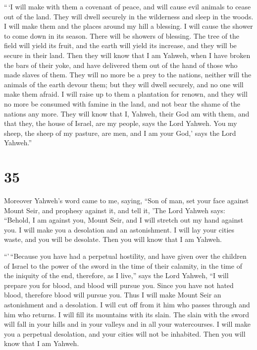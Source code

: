  ``\,`I will make with them a covenant of peace, and will
cause evil animals to cease out of the land. They will dwell securely in
the wilderness and sleep in the woods.  I will make them
and the places around my hill a blessing. I will cause the shower to
come down in its season. There will be showers of blessing.
 The tree of the field will yield its fruit, and the
earth will yield its increase, and they will be secure in their land.
Then they will know that I am Yahweh, when I have broken the bars of
their yoke, and have delivered them out of the hand of those who made
slaves of them.  They will no more be a prey to the
nations, neither will the animals of the earth devour them; but they
will dwell securely, and no one will make them afraid.  I
will raise up to them a plantation for renown, and they will no more be
consumed with famine in the land, and not bear the shame of the nations
any more.  They will know that I, Yahweh, their God am
with them, and that they, the house of Israel, are my people, says the
Lord Yahweh.  You my sheep, the sheep of my pasture, are
men, and I am your God,' says the Lord Yahweh.''

\hypertarget{section-33}{%
\section{35}\label{section-33}}

 Moreover Yahweh's word came to me, saying, 
``Son of man, set your face against Mount Seir, and prophesy against it,
 and tell it, 'The Lord Yahweh says: ``Behold, I am
against you, Mount Seir, and I will stretch out my hand against you. I
will make you a desolation and an astonishment.  I will
lay your cities waste, and you will be desolate. Then you will know that
I am Yahweh.

 ``'\,``Because you have had a perpetual hostility, and
have given over the children of Israel to the power of the sword in the
time of their calamity, in the time of the iniquity of the end,
 therefore, as I live,'' says the Lord Yahweh, ``I will
prepare you for blood, and blood will pursue you. Since you have not
hated blood, therefore blood will pursue you.  Thus I will
make Mount Seir an astonishment and a desolation. I will cut off from it
him who passes through and him who returns.  I will fill
its mountains with its slain. The slain with the sword will fall in your
hills and in your valleys and in all your watercourses.  I
will make you a perpetual desolation, and your cities will not be
inhabited. Then you will know that I am Yahweh.

